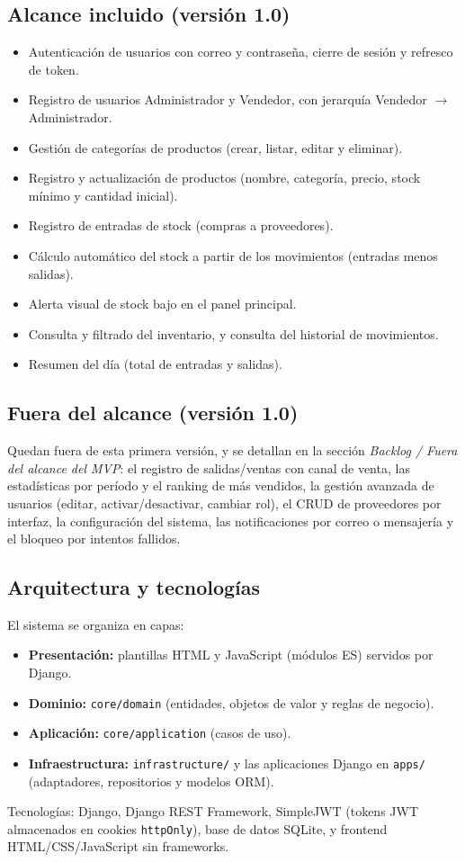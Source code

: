 \documentclass[12pt, a4paper]{article}
\begin{document}
\subsection{Alcance incluido (versión 1.0)}
\begin{itemize}
    \item Autenticación de usuarios con correo y contraseña, cierre de sesión y refresco de token.
    \item Registro de usuarios Administrador y Vendedor, con jerarquía Vendedor $\rightarrow$ Administrador.
    \item Gestión de categorías de productos (crear, listar, editar y eliminar).
    \item Registro y actualización de productos (nombre, categoría, precio, stock mínimo y cantidad inicial).
    \item Registro de entradas de stock (compras a proveedores).
    \item Cálculo automático del stock a partir de los movimientos (entradas menos salidas).
    \item Alerta visual de stock bajo en el panel principal.
    \item Consulta y filtrado del inventario, y consulta del historial de movimientos.
    \item Resumen del día (total de entradas y salidas).
\end{itemize}

\subsection{Fuera del alcance (versión 1.0)}
Quedan fuera de esta primera versión, y se detallan en la sección \emph{Backlog / Fuera del alcance
del MVP}: el registro de salidas/ventas con canal de venta, las estadísticas por período y el
ranking de más vendidos, la gestión avanzada de usuarios (editar, activar/desactivar, cambiar rol),
el CRUD de proveedores por interfaz, la configuración del sistema, las notificaciones por correo o
mensajería y el bloqueo por intentos fallidos.

\subsection{Arquitectura y tecnologías}
El sistema se organiza en capas:
\begin{itemize}
    \item \textbf{Presentación:} plantillas HTML y JavaScript (módulos ES) servidos por Django.
    \item \textbf{Dominio:} \texttt{core/domain} (entidades, objetos de valor y reglas de negocio).
    \item \textbf{Aplicación:} \texttt{core/application} (casos de uso).
    \item \textbf{Infraestructura:} \texttt{infrastructure/} y las aplicaciones Django en \texttt{apps/}
          (adaptadores, repositorios y modelos ORM).
\end{itemize}
Tecnologías: Django, Django REST Framework, SimpleJWT (tokens JWT almacenados en cookies
\texttt{httpOnly}), base de datos SQLite, y frontend HTML/CSS/JavaScript sin frameworks.
\end{document}
